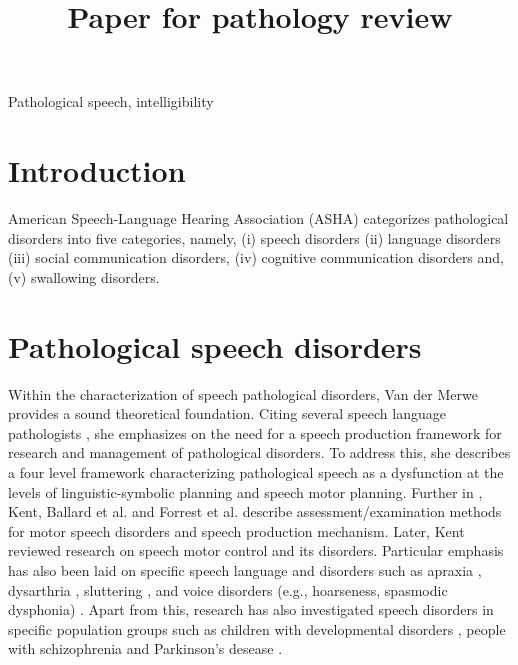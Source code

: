 \documentclass{article}
\title{Paper for pathology review}
\begin{document}
\ninept
%
\maketitle
%
\begin{abstract}
 
\end{abstract}
%
\begin{keywords}
Pathological speech, intelligibility 
\end{keywords}
%
\section{Introduction}
\label{sec:intro}
American Speech-Language Hearing Association (ASHA) \cite{american2008council} categorizes pathological disorders into five categories, namely, (i) speech disorders (ii) language disorders (iii) social communication disorders, (iv) cognitive communication disorders and, (v) swallowing disorders. 

\section{Pathological speech disorders}
Within the characterization of speech pathological disorders, Van der Merwe \cite{van1997characterization,mcneil2009clinical} provides a sound theoretical foundation. 
Citing several speech language pathologists \cite{mcneil1990motoric,kent1987relative,marquardt1984elusive}, she emphasizes on the need for a speech production framework for research and management of pathological disorders. 
To address this, she describes a four level framework characterizing pathological speech as a dysfunction at the levels of linguistic-symbolic planning and speech motor planning. 
Further in \cite{mcneil2009clinical}, Kent, Ballard et al. and Forrest et al. describe assessment/examination methods for motor speech disorders and speech production mechanism. 
Later, Kent \cite{kent2000research} reviewed research on speech motor control and its disorders.
Particular emphasis has also been laid on specific speech language and disorders such as apraxia \cite{wambaugh2002summary}, dysarthria \cite{yorkston2007evidence}, sluttering \cite{bothe2006stuttering}, and voice disorders (e.g., hoarseness, spasmodic dysphonia) \cite{aronson2011clinical}. 
Apart from this, research has also investigated speech disorders in specific population groups such as children with developmental disorders \cite{millar2006impact,schlosser2008effects}, people with schizophrenia \cite{delisi2001speech} and Parkinson's desease \cite{critchley1981speech}.
\end{document}
